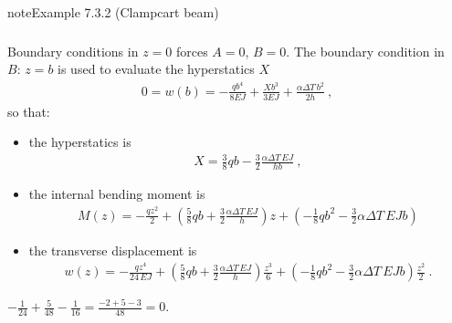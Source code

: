 \documentclass[letterpaper,10pt,english]{jupyterBook}
\begin{document}
\begin{sphinxadmonition}{note}{Example 7.3.2 (Clamp\sphinxhyphen{}cart beam)}
\begin{equation*}
\begin{split}
\begin{aligned}
\end{aligned}\end{split}
\end{equation*}
\sphinxAtStartPar
Boundary conditions in \(z=0\) forces \(A = 0\), \(B = 0\). The boundary condition in \(B: \, z = b\) is used to evaluate the hyperstatics \(X\)
\begin{equation*}
\begin{split}0 = w(b) = -\frac{qb^4}{8 EJ} + \frac{Xb^3}{3EJ} + \frac{\alpha \Delta T \, b^2}{2 h} \ ,\end{split}
\end{equation*}
\sphinxAtStartPar
so that:
\begin{itemize}
\item {} 
\sphinxAtStartPar
the hyperstatics is
\begin{equation*}
\begin{split}X = \frac{3}{8} qb - \frac{3}{2}\frac{\alpha \Delta T \, EJ}{hb} \ ,\end{split}
\end{equation*}
\item {} 
\sphinxAtStartPar
the internal bending moment is
\begin{equation*}
\begin{split}M(z) = - \frac{qz^2}{2} + \left( \frac{5}{8} qb + \frac{3}{2} \frac{\alpha \Delta T \, EJ}{h} \right) z + \left( - \frac{1}{8} q b^2 - \frac{3}{2} \alpha \Delta T \, EJ b \right) \end{split}
\end{equation*}
\item {} 
\sphinxAtStartPar
the transverse displacement is
\begin{equation*}
\begin{split}w(z) = -\frac{q z^4}{24 \, EJ} + \left( \frac{5}{8} qb + \frac{3}{2} \frac{\alpha \Delta T \, EJ}{h} \right) \frac{z^3}{6} + \left( - \frac{1}{8} q b^2 - \frac{3}{2} \alpha \Delta T \, EJ b \right) \frac{z^2}{2} \ .\end{split}
\end{equation*}
\end{itemize}

\sphinxAtStartPar
{} \(-\frac{1}{24} + \frac{5}{48} - \frac{1}{16} = \frac{-2+5-3}{48} = 0 .\)


\end{sphinxadmonition}
\end{document}
